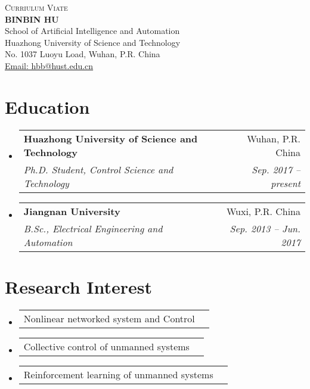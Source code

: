 \documentclass[letterpaper,11pt]{article}
\makeatletter
\newcommand{\resumeItem}[1]{
  \item\small{
    {#1 \vspace{-2pt}}
  }
}
\newcommand{\resumeSubheading}[4]{
  \vspace{-2pt}\item
    \begin{tabular*}{0.97\textwidth}[t]{l@{\extracolsep{\fill}}r}
      \textbf{#1} & #2 \\
      \textit{\small#3} & \textit{\small #4} \\
    \end{tabular*}\vspace{-7pt}
}
\newcommand{\resumeProjectHeading}[2]{
    \item
    \begin{tabular*}{0.97\textwidth}{l@{\extracolsep{\fill}}r}
      \small#1 & #2 \\
    \end{tabular*}\vspace{-7pt}
}
\newcommand{\resumeSubHeadingListStart}{\begin{itemize}[leftmargin=0.15in, label={}]}
\newcommand{\resumeSubHeadingListEnd}{\end{itemize}}
\makeatother
\begin{document}

\begin{center}
  
    {\huge \scshape Curriulum Viate} \\ \vspace{1pt}
     \textbf{\scshape BINBIN HU} \\ \vspace{1pt}
     {School of Artificial Intelligence and Automation} \\ \vspace{1pt}
     {Huazhong University of Science and Technology} \\ \vspace{1pt}
     {No. 1037 Luoyu Load, Wuhan, P.R. China} \\ \vspace{1pt}
    \href{mailto:hbb@hust.edu.cn}{Email: hbb@hust.edu.cn}  
    
\end{center}


\section{Education}
  \resumeSubHeadingListStart
    \resumeSubheading
      {Huazhong University of Science and Technology}{Wuhan, P.R. China}
      {Ph.D. Student, Control Science and Technology}{Sep. 2017 -- present}
    \resumeSubheading
      {Jiangnan University}{Wuxi, P.R. China}
      {B.Sc., Electrical Engineering and Automation}{Sep. 2013 -- Jun. 2017}
  \resumeSubHeadingListEnd

\section{Research Interest}
 \resumeSubHeadingListStart
 \resumeProjectHeading
 {Nonlinear networked system and Control}{}
  \resumeProjectHeading
 {Collective control of unmanned systems}{}
  \resumeProjectHeading
 {Reinforcement learning of unmanned systems}{}
 \resumeSubHeadingListEnd
 
\end{document}
